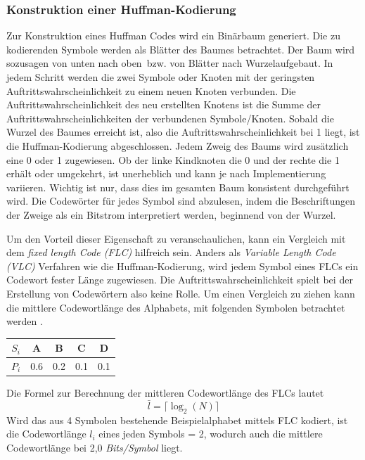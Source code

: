 \subsubsection{Konstruktion einer Huffman-Kodierung}
\label{subsubsec:konstruktion_huffman}
Zur Konstruktion eines Huffman Codes wird ein Binärbaum generiert.
Die zu kodierenden Symbole werden als Blätter des Baumes betrachtet.
Der Baum wird sozusagen von \glqq unten nach oben\grqq\ bzw. von \glqq Blätter nach Wurzel\grqq aufgebaut. \newline
In jedem Schritt werden die zwei Symbole oder Knoten mit der geringsten Auftrittswahrscheinlichkeit zu einem neuen Knoten verbunden.
Die Auftrittswahrscheinlichkeit des neu erstellten Knotens ist die Summe der Auftrittswahrscheinlichkeiten der verbundenen Symbole/Knoten.
Sobald die Wurzel des Baumes erreicht ist, also die Auftrittswahrscheinlichkeit bei 1 liegt, ist die Huffman-Kodierung abgeschlossen.
Jedem Zweig des Baums wird zusätzlich eine 0 oder 1 zugewiesen.
Ob der linke Kindknoten die 0 und der rechte die 1 erhält oder umgekehrt, ist unerheblich und kann je nach Implementierung variieren.
Wichtig ist nur, dass dies im gesamten Baum konsistent durchgeführt wird.
Die Codewörter für jedes Symbol sind abzulesen, indem die Beschriftungen der Zweige als ein Bitstrom interpretiert werden, beginnend von der Wurzel.

Um den Vorteil dieser Eigenschaft zu veranschaulichen, kann ein Vergleich mit dem \textit{fixed length Code (FLC)} hilfreich sein.
Anders als \textit{Variable Length Code (VLC)} Verfahren wie die Huffman-Kodierung, wird jedem Symbol eines FLCs ein Codewort fester Länge zugewiesen.
Die Auftrittswahrscheinlichkeit spielt bei der Erstellung von Codewörtern also keine Rolle.
Um einen Vergleich zu ziehen kann die mittlere Codewortlänge des Alphabets, mit folgenden Symbolen betrachtet werden \cite{Moffat2019}.

\begin{table}[h]
\centering
\begin{tabular}{ccccc}
\toprule
\textbf{\textit{\(S_i\)}} & {A} & {B} & {C} & {D} \\
\midrule
\textbf{\textit{\(P_i\)}} & 0.6 & 0.2 & 0.1 & 0.1\\
\bottomrule
\end{tabular}
\end{table}

Die Formel zur Berechnung der mittleren Codewortlänge des FLCs lautet
\begin{equation*}
\bar{l} = \lceil \log_2(N) \rceil
\end{equation*}
Wird das aus 4 Symbolen bestehende Beispielalphabet mittels FLC kodiert, ist die Codewortlänge \(l_i\) eines jeden Symbols = 2, wodurch auch die mittlere Codewortlänge bei 2,0 \textit{Bits/Symbol} liegt.


